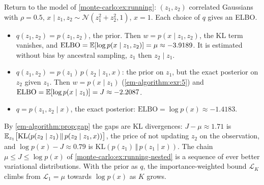 \begin{notechapter}
\begin{example}\label{em-algorithm:ex:running}
Return to the model of \cref{monte-carlo:ex:running}: $(z_1,z_2)$ correlated
Gaussians with $\rho = 0.5$, $x\mid z_1,z_2\sim\mathcal N(z_1^2 + z_2^2, 1)$, $x = 1$. Each
choice of $q$ gives an ELBO.
\begin{itemize}[nosep]
  \item $q(z_1,z_2) = p(z_1,z_2)$, the prior. Then $w = p(x\mid z_1,z_2)$, the KL term
        vanishes, and $\mathrm{ELBO} = \mathbb{E}[\log p(x\mid z_1,z_2)] = \mu\approx-3.9189$. It is
        estimated without bias by ancestral sampling, $z_1$ then $z_2\mid z_1$.
  \item $q(z_1,z_2) = p(z_1)\,p(z_2\mid z_1,x)$: the prior on $z_1$, but the exact
        posterior on $z_2$ given $z_1$. Then $w = p(x\mid z_1)$ (\cref{em-algorithm:exr:5})
        and $\mathrm{ELBO} = \mathbb{E}[\log p(x\mid z_1)] = J\approx-2.2087$.
  \item $q = p(z_1,z_2\mid x)$, the exact posterior: $\mathrm{ELBO} = \log p(x)\approx-1.4183$.
\end{itemize}
By \cref{em-algorithm:prop:gap} the gaps are KL divergences: $J - \mu\approx1.71$ is
$\mathbb{E}_{z_1}\bigl[\mathrm{KL}(p(z_2\mid z_1)\,\Vert\,p(z_2\mid z_1,x))\bigr]$, the price of not
updating $z_2$ on the observation, and $\log p(x) - J\approx0.79$ is
$\mathrm{KL}(p(z_1)\,\Vert\,p(z_1\mid x))$. The chain $\mu\leq J\leq\log p(x)$ of
\cref{monte-carlo:ex:running-nested} is a sequence of ever better variational
distributions. With the prior as $q$, the importance-weighted bound $\mathcal L_K$
climbs from $\mathcal L_1 = \mu$ towards $\log p(x)$ as $K$ grows.
\end{example}


\end{notechapter}
